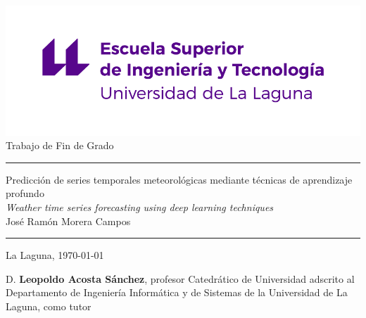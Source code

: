 \documentclass[spanish,a4paper,12pt,oneside]{extreport}
\begin{document}
\renewcommand\listtablename{Índice de Tablas}    
\renewcommand\listfigurename{Índice de Figuras}    

\pagestyle{empty}
\thispagestyle{empty}


\newcommand{\HRule}{\rule{\linewidth}{1mm}}
\setlength{\parindent}{0mm}
\setlength{\parskip}{0mm}


\begin{center}
\includegraphics[scale=0.8]{images/escuela-ingenieria-tecnologia-original}\\[10mm]
{\Huge Trabajo de Fin de Grado}
\end{center}

\HRule
\begin{flushright}
        {\Huge Predicción de series temporales meteorológicas mediante técnicas de aprendizaje profundo } \\[2.5mm]
        {\Large \textit{Weather time series forecasting using deep learning techniques}} \\[5mm]
        {\Large José Ramón Morera Campos} \\[5mm]


\end{flushright}
\HRule
{}
\begin{center}
  \Large La Laguna, \today
\end{center}

\setlength{\parindent}{5mm}

\newpage
\thispagestyle{empty}

D. {\bf Leopoldo Acosta Sánchez}, profesor Catedrático de Universidad adscrito al Departamento de Ingeniería Informática y de Sistemas de la Universidad de La Laguna, como tutor
\end{document}
